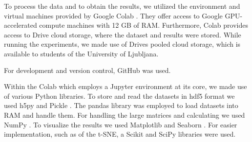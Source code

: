 To process the data and to obtain the results, we utilized the environment and virtual machines provided by Google Colab \cite{colab}.
They offer access to Google GPU-accelerated compute machines with 12 GB of RAM. 
Furthermore, Colab provides access to Drive cloud storage, where the dataset and results were stored.
While running the experiments, we made use of Drives pooled cloud storage, which is available to students of the University of Ljubljana. 

For development and version control, GitHub was used. 

Within the Colab which employs a Jupyter \cite{jupyter} environment at its core, we made use of various Python libraries.
To store and read the datasets in hdf5 format we used h5py  \cite{hdf5} and Pickle  \cite{pickle}.
The pandas \cite{pandas} library was employed to load datasets into RAM and handle them. 
For handling the large matrices and calculating we used NumPy  \cite{numpy}.
To visualize the results we used Matplotlib \cite{matplotlib} and Seaborn \cite{seaborn}.
For easier implementation, such as of the t-SNE, a Scikit  \cite{scikit} and SciPy  \cite{scipy} libraries were used.
